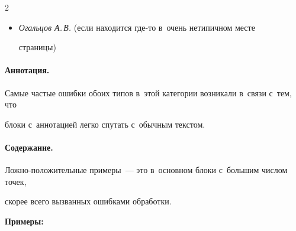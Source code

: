 \begin{multicols}{2}





\begin{itemize}


\item[$\bullet$]


\textit{Огальцов А.\,В.} (если находится где-то в~очень нетипичном месте 


страницы)


\end{itemize}





\vspace*{-10pt}





\paragraph*{Аннотация.}





Самые частые ошибки обоих типов в~этой категории возникали в~связи с~тем, что 


блоки с~аннотацией легко спутать с~обычным текс\-том.





\vspace*{-10pt}





\paragraph*{Содержание.}





Ложно-положительные примеры~--- это в~основном блоки с~большим чис\-лом точек, 


скорее всего вызванных ошибками обработки.





\textbf{Примеры:}





\begin{itemize}






\end{itemize}
\end{multicols}
